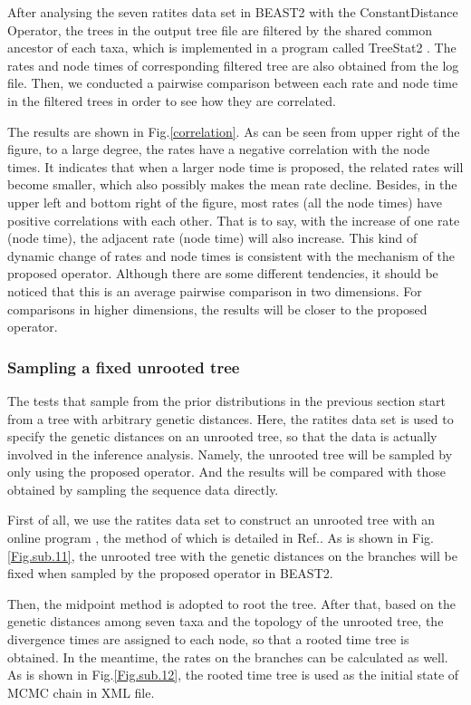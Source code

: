 \documentclass{bmcart}
\begin{document}
After analysing the seven ratites data set in BEAST2 with the ConstantDistance Operator, the trees in the output tree file are filtered by the shared common ancestor of each taxa, which is implemented in a program called TreeStat2 \cite{TreeStat2}. The rates and node times of corresponding filtered tree are also obtained from the log file. Then, we conducted a pairwise comparison between each rate and node time in the filtered trees in order to see how they are correlated. 

The results are shown in Fig.\ref{correlation}. As can be seen from upper right of the figure, to a large degree, the rates have a negative correlation with the node times. It indicates that when a larger node time is proposed, the related rates will become smaller, which also possibly makes the mean rate decline. Besides, in the upper left and bottom right of the figure, most rates (all the node times) have positive correlations with each other. That is to say, with the increase of one rate (node time), the adjacent rate (node time) will also increase. This kind of dynamic change of rates and node times is consistent with the mechanism of the proposed operator. Although there are some different tendencies, it should be noticed that this is an average pairwise comparison in two dimensions. For comparisons in higher dimensions, the results will be closer to the proposed operator. 

\subsubsection*{Sampling a fixed unrooted tree}
The tests that sample from the prior distributions in the previous section start from a tree with arbitrary genetic distances. Here, the ratites data set is used to specify the genetic distances on an unrooted tree, so that the data is actually involved in the inference analysis. Namely, the unrooted tree will be sampled by only using the proposed operator. And the results will be compared with those obtained by sampling the sequence data directly. 

First of all, we use the ratites data set to construct an unrooted tree with an online program \cite{phyml}, the method of which is detailed in Ref.\cite{guindon2010new}.  As is shown in Fig.\ref{Fig.sub.11}, the unrooted tree with the genetic distances on the branches will be fixed when sampled by the proposed operator in BEAST2. 

Then, the midpoint method is adopted to root the tree. After that, based on the genetic distances among seven taxa and the topology of the unrooted tree, the divergence times are assigned to each node, so that a rooted time tree is obtained. In the meantime, the rates on the branches can be calculated as well. As is shown in Fig.\ref{Fig.sub.12}, the rooted time tree is used as the initial state of MCMC chain in XML file.
\end{document}
